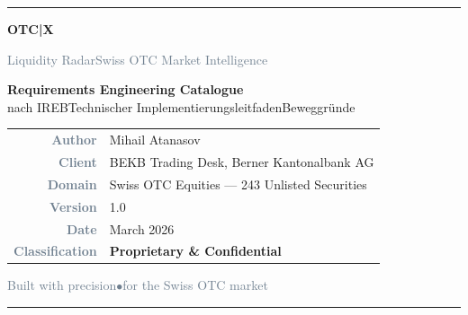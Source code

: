\documentclass[
  11pt,
  a4paper,
  twoside,
  openany
]{report}
\title{}
\author{}
\date{}
\begin{document}
\begin{titlepage}

\begin{center}

\noindent\textcolor{SwissRed}{\rule{\textwidth}{2pt}}

\vspace{12mm}

{\fontsize{42}{50}\selectfont\bfseries\textcolor{DeepNavy}{OTC\;\textcolor{SwissRed}{|}\;X}}

\vspace{6mm}

{\Large\textcolor{SlateGrey}{Liquidity Radar\;\textemdash\;Swiss OTC Market Intelligence}}

\vspace{20mm}

\begin{tcolorbox}[
  colback=DeepNavy,
  colframe=DeepNavy,
  arc=3mm,
  boxrule=0pt,
  width=0.92\textwidth,
  halign=center,
  top=12pt, bottom=12pt
]
{\fontsize{18}{24}\selectfont\bfseries\color{white}
Requirements Engineering Catalogue}\\[6pt]
{\large\color{LightSilver}
nach IREB\;\textbullet\;Technischer Implementierungsleitfaden\;\textbullet\;Beweggründe}
\end{tcolorbox}

\vspace{18mm}

\begin{tabular}{r@{\hskip 10pt}l}
  \textcolor{SlateGrey}{\textbf{Author}}   & Mihail Atanasov \\[4pt]
  \textcolor{SlateGrey}{\textbf{Client}}    & BEKB Trading Desk, Berner Kantonalbank AG \\[4pt]
  \textcolor{SlateGrey}{\textbf{Domain}}    & Swiss OTC Equities — 243 Unlisted Securities \\[4pt]
  \textcolor{SlateGrey}{\textbf{Version}}   & 1.0 \\[4pt]
  \textcolor{SlateGrey}{\textbf{Date}}      & March 2026 \\[4pt]
  \textcolor{SlateGrey}{\textbf{Classification}} & \textcolor{SwissRed}{\textbf{Proprietary \& Confidential}}
\end{tabular}

\vfill

{\small\textcolor{SlateGrey}{Built with precision\;\;$\bullet$\;\;for the Swiss OTC market}}

\vspace{4mm}

\noindent\textcolor{SwissRed}{\rule{\textwidth}{2pt}}

\end{center}
\restoregeometry
\end{titlepage}
\end{document}
